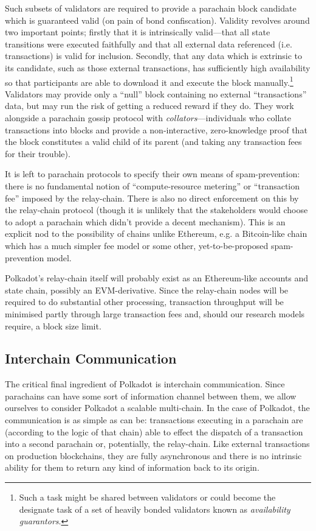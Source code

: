 \documentclass[9pt,oneside]{amsart}
\makeatletter
\newcommand*\eg{e.g.\@\xspace}
\makeatother
\begin{document}
\begin{multicols}{2}
 Such subsets of validators are required to provide a parachain block candidate which is guaranteed valid (on pain of bond confiscation). Validity revolves around two important points; firstly that it is intrinsically valid---that all state transitions were executed faithfully and that all external data referenced (i.e. transactions) is valid for inclusion. Secondly, that any data which is extrinsic to its candidate, such as those external transactions, has sufficiently high availability so that participants are able to download it and execute the block manually.\footnote{Such a task might be shared between validators or could become the designate task of a set of heavily bonded validators known as \textit{availability guarantors}.} Validators may provide only a ``null'' block containing no external ``transactions'' data, but may run the risk of getting a reduced reward if they do. They work alongside a parachain gossip protocol with \emph{collators}---individuals who collate transactions into blocks and provide a non-interactive, zero-knowledge proof that the block constitutes a valid child of its parent (and taking any transaction fees for their trouble).

 It is left to parachain protocols to specify their own means of spam-prevention: there is no fundamental notion of ``compute-resource metering'' or ``transaction fee'' imposed by the relay-chain. There is also no direct enforcement on this by the relay-chain protocol (though it is unlikely that the stakeholders would choose to adopt a parachain which didn't provide a decent mechanism). This is an explicit nod to the possibility of chains unlike Ethereum, \eg a Bitcoin-like chain which has a much simpler fee model or some other, yet-to-be-proposed spam-prevention model.

 Polkadot's relay-chain itself will probably exist as an Ethereum-like accounts and state chain, possibly an EVM-derivative. Since the relay-chain nodes will be required to do substantial other processing, transaction throughput will be minimised partly through large transaction fees and, should our research models require, a block size limit.

\subsection{Interchain Communication}
\label{interchain-communication}

 The critical final ingredient of Polkadot is interchain communication. Since parachains can have some sort of information channel between them, we allow ourselves to consider Polkadot a scalable multi-chain. In the case of Polkadot, the communication is as simple as can be: transactions executing in a parachain are (according to the logic of that chain) able to effect the dispatch of a transaction into a second parachain or, potentially, the relay-chain. Like external transactions on production blockchains, they are fully asynchronous and there is no intrinsic ability for them to return any kind of information back to its origin.


\end{multicols}
\end{document}
